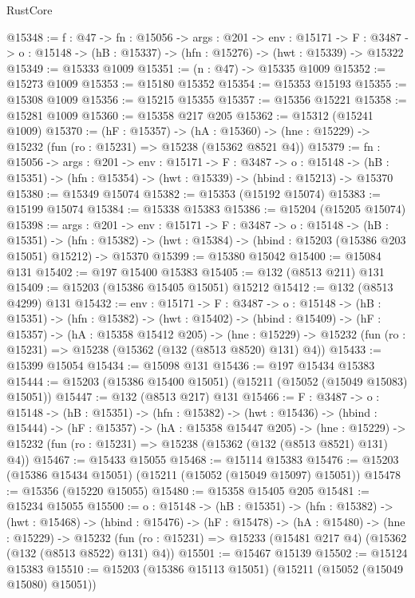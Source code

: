 \begin{lexlean}{RustCore}
\begin{coremodule}
@15348 := {f : @47} ->
  {fn : @15056} ->
  {args : @201} ->
  {env : @15171} ->
  {F : @3487} -> {o : @15148} -> (hB : @15337) -> (hfn : @15276) -> (hwt : @15339) -> @15322
@15349 := @15333 @1009
@15351 := (n : @47) -> @15335 @1009
@15352 := @15273 @1009
@15353 := @15180 @15352
@15354 := @15353 @15193
@15355 := @15308 @1009
@15356 := @15215 @15355
@15357 := @15356 @15221
@15358 := @15281 @1009
@15360 := @15358 @217 @205
@15362 := @15312 (@15241 @1009)
@15370 := (hF : @15357) ->
  (hA : @15360) -> (hne : @15229) -> @15232 (fun (ro : @15231) => @15238 (@15362 @8521 @4))
@15379 := {fn : @15056} ->
  {args : @201} ->
  {env : @15171} ->
  {F : @3487} ->
  {o : @15148} -> (hB : @15351) -> (hfn : @15354) -> (hwt : @15339) -> (hbind : @15213) -> @15370
@15380 := @15349 @15074
@15382 := @15353 (@15192 @15074)
@15383 := @15199 @15074
@15384 := @15338 @15383
@15386 := @15204 (@15205 @15074)
@15398 := {args : @201} ->
  {env : @15171} ->
  {F : @3487} ->
  {o : @15148} ->
  (hB : @15351) ->
  (hfn : @15382) -> (hwt : @15384) -> (hbind : @15203 (@15386 @203 @15051) @15212) -> @15370
@15399 := @15380 @15042
@15400 := @15084 @131
@15402 := @197 @15400 @15383
@15405 := @132 (@8513 @211) @131
@15409 := @15203 (@15386 @15405 @15051) @15212
@15412 := @132 (@8513 @4299) @131
@15432 := {env : @15171} ->
  {F : @3487} ->
  {o : @15148} ->
  (hB : @15351) ->
  (hfn : @15382) ->
  (hwt : @15402) ->
  (hbind : @15409) ->
  (hF : @15357) ->
  (hA : @15358 @15412 @205) ->
  (hne : @15229) -> @15232 (fun (ro : @15231) => @15238 (@15362 (@132 (@8513 @8520) @131) @4))
@15433 := @15399 @15054
@15434 := @15098 @131
@15436 := @197 @15434 @15383
@15444 := @15203 (@15386 @15400 @15051) (@15211 (@15052 (@15049 @15083) @15051))
@15447 := @132 (@8513 @217) @131
@15466 := {F : @3487} ->
  {o : @15148} ->
  (hB : @15351) ->
  (hfn : @15382) ->
  (hwt : @15436) ->
  (hbind : @15444) ->
  (hF : @15357) ->
  (hA : @15358 @15447 @205) ->
  (hne : @15229) -> @15232 (fun (ro : @15231) => @15238 (@15362 (@132 (@8513 @8521) @131) @4))
@15467 := @15433 @15055
@15468 := @15114 @15383
@15476 := @15203 (@15386 @15434 @15051) (@15211 (@15052 (@15049 @15097) @15051))
@15478 := @15356 (@15220 @15055)
@15480 := @15358 @15405 @205
@15481 := @15234 @15055
@15500 := {o : @15148} ->
  (hB : @15351) ->
  (hfn : @15382) ->
  (hwt : @15468) ->
  (hbind : @15476) ->
  (hF : @15478) ->
  (hA : @15480) ->
  (hne : @15229) ->
  @15232 (fun (ro : @15231) => @15233 (@15481 @217 @4) (@15362 (@132 (@8513 @8522) @131) @4))
@15501 := @15467 @15139
@15502 := @15124 @15383
@15510 := @15203 (@15386 @15113 @15051) (@15211 (@15052 (@15049 @15080) @15051))

\end{coremodule}
\end{lexlean}
